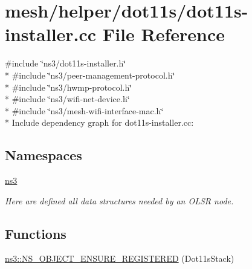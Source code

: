 \hypertarget{dot11s-installer_8cc}{}\section{mesh/helper/dot11s/dot11s-\/installer.cc File Reference}
\label{dot11s-installer_8cc}
{\ttfamily \#include \char`\"{}ns3/dot11s-\/installer.\+h\char`\"{}}\\*
{\ttfamily \#include \char`\"{}ns3/peer-\/management-\/protocol.\+h\char`\"{}}\\*
{\ttfamily \#include \char`\"{}ns3/hwmp-\/protocol.\+h\char`\"{}}\\*
{\ttfamily \#include \char`\"{}ns3/wifi-\/net-\/device.\+h\char`\"{}}\\*
{\ttfamily \#include \char`\"{}ns3/mesh-\/wifi-\/interface-\/mac.\+h\char`\"{}}\\*
Include dependency graph for dot11s-\/installer.cc\+:
\subsection*{Namespaces}
\begin{DoxyCompactItemize}
\item 
 \hyperlink{namespacens3}{ns3}
\begin{DoxyCompactList}\small\item\em Here are defined all data structures needed by an O\+L\+SR node. \end{DoxyCompactList}\end{DoxyCompactItemize}
\subsection*{Functions}
\begin{DoxyCompactItemize}
\item 
\hyperlink{namespacens3_a81c05436bb83539a290424095d4d1744}{ns3\+::\+N\+S\+\_\+\+O\+B\+J\+E\+C\+T\+\_\+\+E\+N\+S\+U\+R\+E\+\_\+\+R\+E\+G\+I\+S\+T\+E\+R\+ED} (Dot11s\+Stack)
\end{DoxyCompactItemize}
